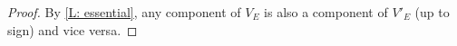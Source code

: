 \begin{proof}
	By \cref{L: essential}, any component of $V_E$ is also a component of $V'_E$ (up to sign) and vice versa.
\end{proof}




\begin{comment}

\begin{lemma}\label{L: essential}
	Let $\uV = \uW \in C^*_\Gamma(M)$ (or $\uV = \uW \in C_*^\Gamma(M)$) be represented by $V,W \in PC^*_\Gamma(M)$ (or $PC^\Gamma_*(M)$), and suppose $V_1$ is an essential component of $V$.
	Then the number of components isomorphic to ${V_1}$ in $V_E$ is equal to the number of such components
	in $W_E$, counting with sign.
	In particular, $V_E \sqcup -W_E$ is trivial
	and each component of $V_E \sqcup -W_E$ appears an even number of times when counting without sign.
	Furthermore, if ${V_1}$ is an essential component of $V$ then it is also an essential component of $W$.
\end{lemma}

\begin{proof}
	We first note that if a component $V_1$ of $V$ is in $V_E$ then every component of $V$ isomorphic to $\pm V_1$ must also be in $V_E$.

	Let $V_1$ be an essential component of $V$.
	Then $V_1$ is also a component of $V \sqcup -W \in Q(M)$.
	We write $V \sqcup -W = T \sqcup D$, where $T$ is trivial and $D$ degenerate.
	As $V_1$ does not have small rank, it cannot be a component of $D$; thus $V_1$ must be a component of $T$.
	Moreover, it cannot possess a (co-)orientation-reversing self-diffeomorphism $\rho$ such that $r_{V_1} \circ \rho = r_{V_1}$ or it would not be essential.
	Therefore, $T$
	must contain a number of components isomorphic to $\pm V_1$ that is $0$ when counted with sign (compare with the proof of \cref{L: Lip L10})
	and so an even number when counted without sign.
	Since $V_1$ is essential in $V$, all components of $V$ isomorphic to $\pm V_1$ must also be contained in $V_E$ and
	the number of such components cannot be $0$ when counted with sign in $V$ alone or $V_1$ would not be essential.
	So there must be isomorphic components (up to sign) in $W$, and the number of such components in $W$ also cannot be $0$ when counted
	with sign.
	Thus all such components in $W$ must be in $W_E$.

	Altogether, we have shown that for each component $V_1$ of $V_E$, there are isomorphic components (up to sign) contained in $W_E$
	and the total number of components isomorphic to $\pm V_1$ in $V_E\sqcup-W_E$, counted with sign, is $0$.
	As this applies for all components of $V_E$, and similarly for all components of $W_E$, we see that $V_E \sqcup -W_E$ is trivial, and that the number of
	components isomorphic to $V_1$, counted with sign, in $V_E$ must equal the number, counted with sign, in $W_E$.
	It follows that $V_1$ appears an
	even number of times in $V_E\sqcup-W_E$ when counted without sign.
\end{proof}
\end{comment}




